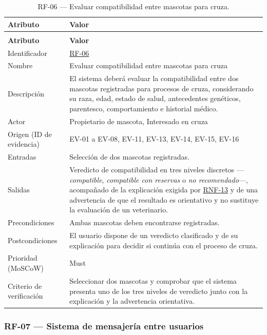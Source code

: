 \documentclass[journal,onecolumn]{IEEEtran}
\makeatletter
\newenvironment{atributos}[2]{%
	\small
	\begin{longtable}{@{}>{\raggedright\arraybackslash}p{4.2cm} >{\raggedright\arraybackslash}p{11.2cm}@{}}
		\caption{#2}\label{tab:#1}\\
		\toprule
		\textbf{Atributo} & \textbf{Valor} \\
		\midrule
		\endfirsthead
		\multicolumn{2}{@{}l}{\small\itshape (continuación)}\\
		\toprule
		\textbf{Atributo} & \textbf{Valor} \\
		\midrule
		\endhead
		\bottomrule
		\endlastfoot
	}{%
	\end{longtable}
	\normalsize
}
\makeatother
\begin{document}
	\begin{atributos}{RF-06}{RF-06 --- Evaluar compatibilidad entre mascotas para cruza.}
		Identificador & \hyperref[tab:RF-06]{RF-06} \\
		Nombre & Evaluar compatibilidad entre mascotas para cruza \\
		Descripción & El sistema deberá evaluar la compatibilidad entre dos mascotas registradas para procesos de cruza, considerando su raza, edad, estado de salud, antecedentes genéticos, parentesco, comportamiento e historial médico. \\
		Actor & Propietario de mascota, Interesado en cruza \\
		Origen (ID de evidencia) & EV-01 a EV-08, EV-11, EV-13, EV-14, EV-15, EV-16 \\
		Entradas & Selección de dos mascotas registradas. \\
		Salidas & Veredicto de compatibilidad en tres niveles discretos --- \emph{compatible}, \emph{compatible con reservas} o \emph{no recomendado}---, acompañado de la explicación exigida por \hyperref[tab:RNF-13]{RNF-13} y de una advertencia de que el resultado es orientativo y no sustituye la evaluación de un veterinario. \\
		Precondiciones & Ambas mascotas deben encontrarse registradas. \\
		Postcondiciones & El usuario dispone de un veredicto clasificado y de su explicación para decidir si continúa con el proceso de cruza. \\
		Prioridad (MoSCoW) & Must \\
		Criterio de verificación & Seleccionar dos mascotas y comprobar que el sistema presenta uno de los tres niveles de veredicto junto con la explicación y la advertencia orientativa. \\
	\end{atributos}
	
	
	\subsubsection{RF-07 --- Sistema de mensajería entre usuarios}
	
\end{document}
